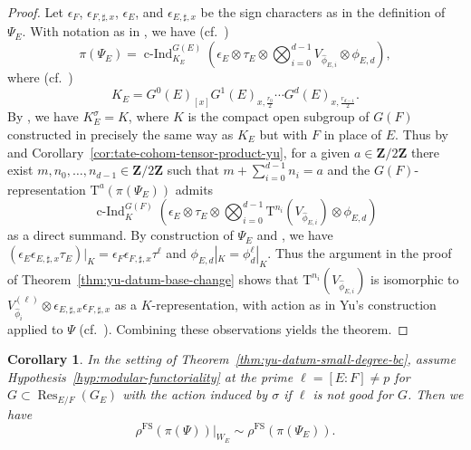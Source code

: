 \documentclass[reqno]{amsart}
\numberwithin{equation}{subsection}
\newcommand{\Z}{\mathbf{Z}}
\newcommand{\wh}[1]{\widehat{#1}}
\DeclareMathOperator{\Res}{Res}
\DeclareMathOperator{\FS}{FS}
\DeclareMathOperator{\cInd}{c-Ind}
\newcommand{\rT}{\ensuremath{\mathrm{T}}\xspace}
\newtheorem{cor}[thm]{Corollary}
\theoremstyle{remark}
\numberwithin{equation}{subsection}
\numberwithin{figure}{subsection}
\begin{document}
\begin{proof}
Let $\epsilon_F$, $\epsilon_{F,\sharp,x}$, $\epsilon_E$, and $\epsilon_{E,\sharp,x}$ be the sign characters as in the definition of $\Psi_E$. With notation as in \cite[\S 6]{CF26a}, we have (cf.\ \cite[(6.5.1)]{CF26a})
\[
\pi(\Psi_E) = \cInd_{K_E}^{G(E)}(\epsilon_E \otimes \tau_E \otimes \bigotimes_{i=0}^{d-1} V_{\wh\phi_{E,i}} \otimes \phi_{E,d}),
\]
where (cf.\ \cite[(6.2.1)]{CF26a})
\[
K_E = G^0(E)_{[x]}G^1(E)_{x,\frac{r_0}{2}} \cdots G^d(E)_{x,\frac{r_{d-1}}{2}}.
\]
By \cite[Lemma~6.4.2]{CF26a}, we have $K_E^\sigma = K$, where $K$ is the compact open subgroup of $G(F)$ constructed in precisely the same way as $K_E$ but with $F$ in place of $E$. Thus by \cite[Lemma~5.2.1]{Cot26b} and Corollary~\ref{cor:tate-cohom-tensor-product-yu}, for a given $a \in \Z/2\Z$ there exist $m, n_0,\dots,n_{d-1} \in \Z/2\Z$ such that $m + \sum_{i=0}^{d-1} n_i = a$ and the $G(F)$-representation $\rT^a(\pi(\Psi_E))$ admits
\[
\cInd_K^{G(F)}(\epsilon_E \otimes \tau_E \otimes \bigotimes_{i=0}^{d-1} \rT^{n_i}(V_{\wh\phi_{E,i}}) \otimes \phi_{E,d})
\]
as a direct summand. By construction of $\Psi_E$ and \cite[Proposition~7.1.2]{CF26a}, we have $(\epsilon_E\epsilon_{E,\sharp,x}\tau_E)|_K = \epsilon_F\epsilon_{F,\sharp,x}\tau^\ell$ and $\phi_{E,d}|_K = \phi_d^\ell|_K$. Thus the argument in the proof of Theorem~\ref{thm:yu-datum-base-change} shows that $\rT^{n_i}(V_{\wh\phi_{E,i}})$ is isomorphic to $V_{\wh\phi_i}^{(\ell)} \otimes \epsilon_{E,\sharp,x}\epsilon_{F,\sharp,x}$ as a $K$-representation, with action as in Yu's construction applied to $\Psi$ (cf.\ \cite[\S 6.3 and Lemma~6.4.5]{CF26a}). Combining these observations yields the theorem.
\end{proof}

\begin{cor}\label{cor:yu-datum-small-degree-bc-parameter}
In the setting of Theorem~\ref{thm:yu-datum-small-degree-bc}, assume Hypothesis~\ref{hyp:modular-functoriality} at the prime $\ell=[E:F]\neq p$ for $G\subset\Res_{E/F}(G_E)$ with the action induced by $\sigma$ if $\ell$ is not good for $G$. Then we have 
\[
\rho^{\FS}(\pi(\Psi))|_{W_E} \sim \rho^{\FS}(\pi(\Psi_E)).
\]
\end{cor}
\end{document}
